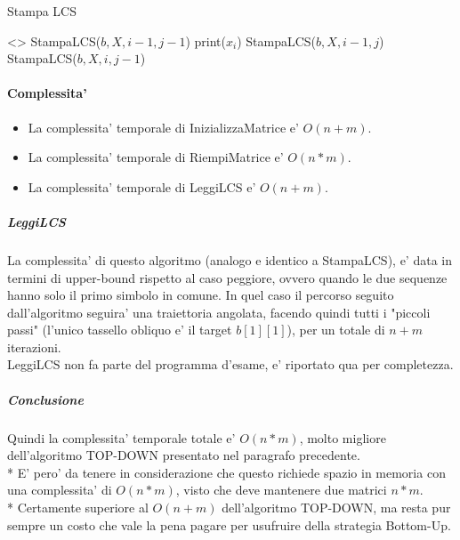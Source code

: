 \begin{algorithm}
    \renewcommand\thealgorithm{}
    \caption{Stampa LCS}
    \begin{algorithmic}
                \State \Return <>
            \EndIf
                \State StampaLCS($b, X, i-1, j-1$)
                \State print($x_{i}$)
            \Else
                    \State StampaLCS($b, X, i-1, j$)
                \Else
                    \State StampaLCS($b, X, i, j-1$)
                \EndIf
            \EndIf
        \EndProcedure
    \end{algorithmic}
\end{algorithm}

\paragraph{Complessita'}

\begin{itemize}
    \item La complessita' temporale di InizializzaMatrice e' $O(n+m)$.
    \item La complessita' temporale di RiempiMatrice e' $O(n*m)$.
    \item La complessita' temporale di LeggiLCS e' $O(n+m)$.
\end{itemize}

\subparagraph{LeggiLCS}
La complessita' di questo algoritmo (analogo e identico a StampaLCS), e' data in termini di upper-bound rispetto al caso peggiore, ovvero quando le due sequenze hanno solo il primo simbolo in comune. In quel caso il percorso seguito dall'algoritmo seguira' una traiettoria angolata, facendo quindi tutti i "piccoli passi" (l'unico tassello obliquo e' il target $b[1][1]$), per un totale di $n+m$ iterazioni. \\
LeggiLCS non fa parte del programma d'esame, e' riportato qua per completezza.

\subparagraph{Conclusione}
Quindi la complessita' temporale totale e' $O(n*m)$, molto migliore dell'algoritmo TOP-DOWN presentato nel paragrafo precedente. \\*
E' pero' da tenere in considerazione che questo richiede spazio in memoria con una complessita' di $O(n * m)$, visto che deve mantenere due matrici $n*m$. \\*
Certamente superiore al $O(n + m)$ dell'algoritmo TOP-DOWN, ma resta pur sempre un costo che vale la pena pagare per usufruire della strategia Bottom-Up.
